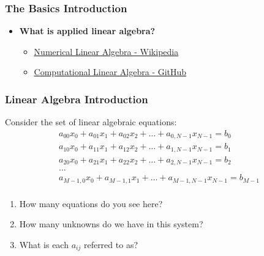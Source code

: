 \documentclass[12pt]{beamer}
\newcommand{\FrameTitle}[2]{\frametitle{#1 \hfill \small\textnormal{\textcolor{midgray}{#2}}}}
\begin{document}
\begin{frame}\FrameTitle{The Basics}{Introduction}
    \begin{itemize}
        \item[] {\Large\textbf{What is applied linear algebra?}}
        \begin{itemize}
            \item[---] \href{https://en.wikipedia.org/wiki/Numerical_linear_algebra}{\color{orange!40}Numerical Linear Algebra - Wikipedia}
            \vspace*{2pt}
            \item[---] \href{https://comp-lin-alg.github.io/}{\color{orange!40}Computational Linear Algebra - GitHub}
        \end{itemize}
    \end{itemize}
\end{frame}

\begin{frame}\FrameTitle{Linear Algebra}{Introduction}
    Consider the set of linear algebraic equations:
    \begin{align*}
        a_{00}x_{0} + a_{01}x_{1} + a_{02}x_{2} + \ldots + a_{0,N-1}x_{N-1} = b_0\\
        a_{10}x_{0} + a_{11}x_{1} + a_{12}x_{2} + \ldots + a_{1,N-1}x_{N-1} = b_1\\
        a_{20}x_{0} + a_{21}x_{1} + a_{22}x_{2} + \ldots + a_{2,N-1}x_{N-1} = b_2\\
        \ldots\\
        a_{M-1,0}x_{0} + a_{M-1,1}x_{1} + \ldots + a_{M-1,N-1}x_{N-1} = b_{M-1}\\
    \end{align*}

    \vspace*{-1em}{\Large\textbf{\color{question}{Quiz:}}}\vspace*{6pt}
    \begin{enumerate}
        \item[1.] How many equations do you see here?
        \item[2.] How many unknowns do we have in this system?
        \item[3.] What is each $a_{ij}$ referred to as?
    \end{enumerate}
\end{frame}
\end{document}
